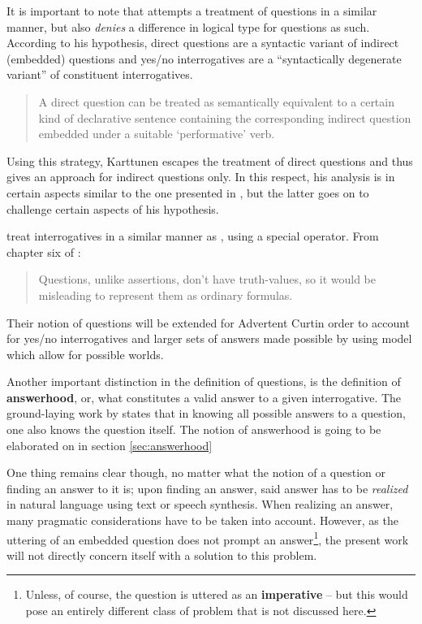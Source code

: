 \documentclass[11pt,a4paper]{article}
\newcommand{\term}[1]{\textsf{\textbf{#1}}} %
\newcommand{\pn}{\textsf} %
\newcommand{\acurt}{\pn{Advertent Curt}}
\theoremstyle{remark}
\theoremstyle{remark}
\theoremstyle{definition}
\begin{document}
It is important to note that \cite{karttunen:1977} attempts a treatment of
questions in a similar manner, but also \emph{denies} a difference in logical
type for questions as such. According to his hypothesis, direct questions are a
syntactic variant of indirect (embedded) questions and yes/no interrogatives are
a ``syntactically degenerate variant'' of constituent interrogatives.

\begin{quote}A direct question can be treated as semantically equivalent to a
certain kind of declarative sentence containing the corresponding indirect
question embedded under  a suitable `performative' verb.\end{quote}

Using this strategy, Karttunen escapes the treatment of direct  questions and
thus gives an approach for indirect questions only.
In this respect, his analysis is in certain aspects similar to the one presented in
\cite{gs:sawhq}, but the latter goes on to challenge certain aspects of his
hypothesis.

\cite{blackburnbos:cl1} treat interrogatives in a similar manner as \cite{gs:q},
using a special operator. From chapter six of \cite{blackburnbos:cl1}:

\begin{quote}
  Questions, unlike assertions, don't have truth-values, so it would be
  misleading to represent them as ordinary formulas.
\end{quote}

Their notion of questions will be extended for \acurt in order to account for
yes/no interrogatives and larger sets of answers made possible by using model
which allow for possible worlds.


Another important distinction in the definition of questions, is the definition
of \term{answerhood}, or, what constitutes a valid answer to a given
interrogative. The ground-laying work by \cite{hamblin:q} states that in knowing
all possible answers to a question, one also knows the question itself. The
notion of answerhood is going to be elaborated on in section \ref{sec:answerhood}

One thing remains clear though, no matter what the notion of a question or
finding an answer to it is; upon
finding an answer, said answer has to be \emph{realized} in natural language
using text or speech synthesis. When realizing an answer, many pragmatic
considerations have to be taken into account.
However, as the uttering of an embedded question does not prompt an
answer\footnote{Unless, of course, the question is uttered as an
\term{imperative} -- but this would pose an entirely different class of problem
that is not discussed here.}, the present
work will not directly concern itself with a solution to this problem.
\end{document}
